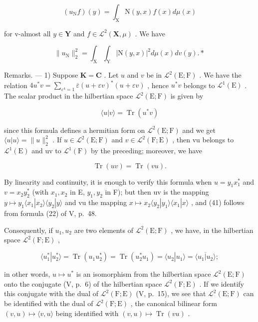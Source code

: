 \[
(u _ {\mathrm{N}} f) (y) = \int_ {\mathrm{X}} \mathrm{N} (y, x) f (x) d \mu (x)\tag{38}
\]

for v-almost all \(y \in \mathbf{Y}\) and \(f \in \mathcal{L}^2(\mathbf{X}, \mu)\) . We have

\[
\| u _ {\mathrm{N}} \| _ {2} ^ {2} = \int_ {\mathrm{X}} \int_ {\mathrm{Y}} | \mathrm{N} (y, x) | ^ {2} d \mu (x) d v (y). *\tag{39}
\]

Remarks. --- 1) Suppose \(\mathbf{K} = \mathbf{C}\) . Let \(u\) and \(v\) be in \(\mathcal{L}^2(\mathrm{E};\mathrm{F})\) . We have the relation \(4u^{*}v = \sum_{\varepsilon^{4} = 1}\overline{\varepsilon} (u + \varepsilon v)^{*}(u + \varepsilon v)\) , hence \(u^{*}v\) belongs to \(\mathcal{L}^1(\mathrm{E})\) . The scalar product in the hilbertian space \(\mathcal{L}^2(\mathrm{E};\mathrm{F})\) is given by

\[
\langle u | v \rangle = \operatorname{Tr} (u ^ {*} v)\tag{40}
\]

since this formula defines a hermitian form on \(\mathcal{L}^{2}(\mathrm{E};\mathrm{F})\) and we get \(\langle u|u\rangle=\|u\|_{2}^{2}\) . If \(u\in\mathcal{L}^{2}(\mathrm{E};\mathrm{F})\) and \(v\in\mathcal{L}^{2}(\mathrm{F};\mathrm{E})\) , then vu belongs to \(\mathcal{L}^{1}(\mathrm{E})\) and uv to \(\mathcal{L}^{1}(\mathrm{F})\) by the preceding; moreover, we have

\[
\operatorname{Tr} (u v) = \operatorname{Tr} (v u).\tag{41}
\]

By linearity and continuity, it is enough to verify this formula when \(u = y_{1}x_{1}^{*}\) and \(v = x_{2}y_{2}^{*}\) (with \(x_{1}, x_{2}\) in E, \(y_{1}, y_{2}\) in F); but then uv is the mapping \(y \mapsto y_{1} \langle x_{1}|x_{2} \rangle \langle y_{2}|y \rangle\) and vu the mapping \(x \mapsto x_{2} \langle y_{2}|y_{1} \rangle \langle x_{1}|x \rangle\) , and (41) follows from formula (22) of V, p.~48.

Consequently, if \(u_{1}, u_{2}\) are two elements of \(\mathcal{L}^2(\mathrm{E};\mathrm{F})\) , we have, in the hilbertian space \(\mathcal{L}^2(\mathrm{F};\mathrm{E})\) ,

\[
\langle u _ {1} ^ {*} | u _ {2} ^ {*} \rangle = \operatorname{Tr} (u _ {1} u _ {2} ^ {*}) = \operatorname{Tr} (u _ {2} ^ {*} u _ {1}) = \langle u _ {2} | u _ {1} \rangle = \overline {{\langle u _ {1} | u _ {2} \rangle}};\tag{42}
\]

in other words, \(u \mapsto u^*\) is an isomorphism from the hilbertian space \(\mathcal{L}^2(\mathrm{E};\mathrm{F})\) onto the conjugate (V, p.~6) of the hilbertian space \(\mathcal{L}^2(\mathrm{F};\mathrm{E})\) . If we identify this conjugate with the dual of \(\mathcal{L}^2 (\mathrm{F};\mathrm{E})\) (V, p.~15), we see that \(\mathcal{L}^2 (\mathrm{E};\mathrm{F})\) can be identified with the dual of \(\mathcal{L}^2 (\mathrm{F};\mathrm{E})\) , the canonical bilinear form \((v,u)\mapsto \langle v,u\rangle\) being identified with \((v,u)\mapsto \operatorname {Tr}(vu)\) .

